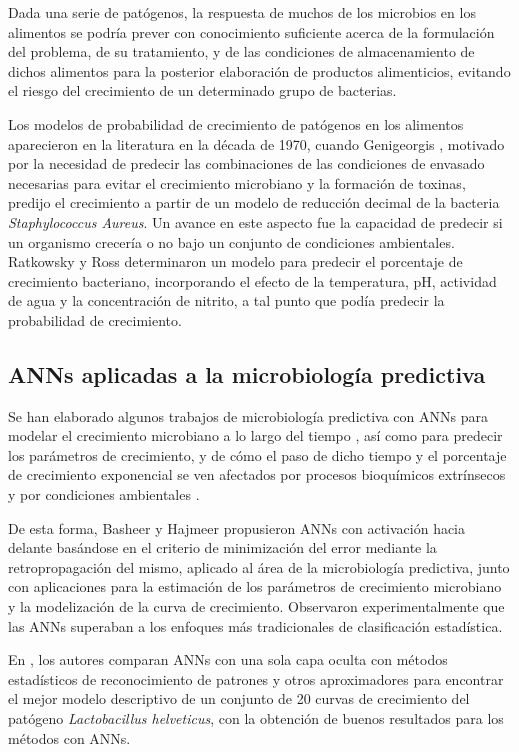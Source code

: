Dada una serie de patógenos, la respuesta de muchos de los microbios en los
alimentos se podría prever con conocimiento suficiente acerca de la formulación del
problema, de su tratamiento, y de las condiciones de almacenamiento de dichos alimentos para la
posterior elaboración de productos alimenticios, evitando el riesgo del crecimiento de un
determinado grupo de bacterias.

Los modelos de probabilidad de crecimiento de patógenos en los alimentos aparecieron en
la literatura en la década de 1970, cuando Genigeorgis \cite{Genigeorgis1971}, motivado
por la necesidad de predecir las combinaciones de las condiciones de envasado necesarias para evitar
el
crecimiento microbiano y la formación de toxinas, predijo el crecimiento a partir de un modelo de
reducción decimal de la bacteria \textit{Staphylococcus Aureus}. Un avance en este aspecto fue la
capacidad de predecir si un organismo crecería o no bajo un conjunto de condiciones
ambientales. Ratkowsky y Ross \cite{Ratkowsky1995} determinaron un modelo para predecir el
porcentaje de crecimiento bacteriano, incorporando el efecto de la temperatura, pH,
actividad de agua y la concentración de nitrito, a tal punto que podía predecir la
probabilidad de crecimiento.

\subsection{ANNs aplicadas a la microbiología predictiva}
\noindent Se han elaborado algunos trabajos de microbiología predictiva con ANNs
para modelar el crecimiento microbiano a lo largo del tiempo
\cite{Basheer2000,Schepers2000,Hajmeer2000}, así como para predecir los parámetros
de crecimiento, y de cómo el paso de dicho tiempo y el porcentaje de crecimiento
exponencial se ven
afectados por procesos bioquímicos extrínsecos y por condiciones ambientales
\cite{Jeyamkondan2001,Garcia2003,Garcia2005}.

De esta forma, Basheer y Hajmeer
\cite{Basheer2000} propusieron ANNs con activación hacia delante basándose en el criterio de
minimización del error mediante la retropropagación del mismo, aplicado al área de la
microbiología predictiva, junto con aplicaciones para la estimación de los parámetros de crecimiento
microbiano y la
modelización de la curva de crecimiento. Observaron experimentalmente que las ANNs
superaban a los enfoques más tradicionales de clasificación estadística.

En \cite{Schepers2000}, los autores  comparan ANNs con una sola capa oculta con métodos
estadísticos de reconocimiento de patrones
y otros aproximadores para encontrar el mejor modelo descriptivo de un conjunto de 20 curvas de
crecimiento del patógeno \textit{Lactobacillus helveticus}, con la obtención de buenos
resultados para los métodos con ANNs.

